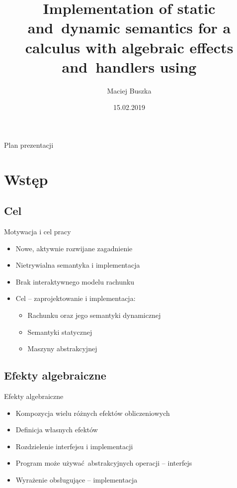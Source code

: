 \documentclass{beamer}
\title[A calculus with algebraic effects and~handlers]{Implementation of static and~dynamic semantics for a calculus with algebraic effects and~handlers using \Redex}
\author{Maciej Buszka}
\institute{Instytut Informatyki UWr}
\date{15.02.2019}
\begin{document}
\begin{frame}
  \titlepage
\end{frame}


\begin{frame}{Plan prezentacji}
  \tableofcontents
\end{frame}

\section{Wstęp}
\subsection{Cel}
\begin{frame}{Motywacja i cel pracy}
  \begin{itemize}
    \item Nowe, aktywnie rozwijane zagadnienie
    \pause
    \item Nietrywialna semantyka i implementacja
    \pause
    \item Brak interaktywnego modelu rachunku
    \pause
    \item Cel -- zaprojektowanie i implementacja:
    \begin{itemize}
      \pause
      \item Rachunku oraz jego semantyki dynamicznej
      \pause
      \item Semantyki statycznej
      \pause
      \item Maszyny abstrakcyjnej
    \end{itemize}
  \end{itemize}
\end{frame}

\subsection{Efekty algebraiczne}
\begin{frame}{Efekty algebraiczne}
  \begin{itemize}
    \item Kompozycja wielu różnych efektów obliczeniowych
    \pause
    \item Definicja własnych efektów
    \pause
    \item Rozdzielenie interfejsu i implementacji
    \pause
    \item Program może używać abstrakcyjnych operacji -- interfejs
    \pause
    \item Wyrażenie obsługujące -- implementacja
  \end{itemize}
\end{frame}
\end{document}
